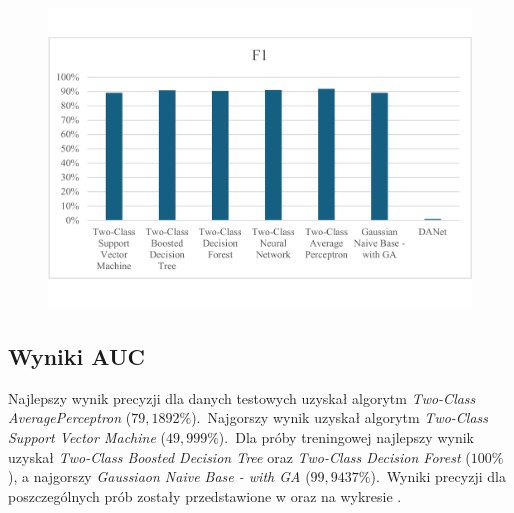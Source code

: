 \begin{figure}[H]
    \centering
    \includegraphics[width=\textwidth]{images/f1-res}
    \label{fig:f1-res}
\end{figure}

\subsection{Wyniki AUC}
Najlepszy wynik precyzji dla danych testowych uzyskał algorytm \textit{Two-Class AveragePerceptron} ($79,1892\%$).\ Najgorszy wynik uzyskał algorytm \textit{Two-Class Support Vector Machine} ($49,999\%$).\ Dla próby treningowej najlepszy wynik uzyskał \textit{Two-Class Boosted Decision Tree} oraz \textit{Two-Class Decision Forest} ($100\%$), a najgorszy \textit{Gaussiaon Naive Base - with GA} ($99,9437\%$).\ Wyniki precyzji dla poszczególnych prób zostały przedstawione w  oraz na wykresie .

